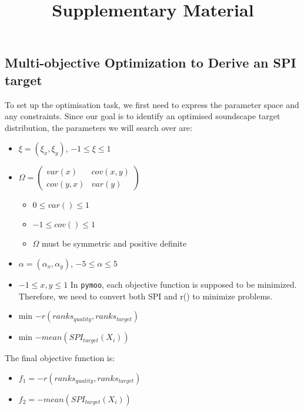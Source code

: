 \documentclass[
  letterpaper,
  DIV=11,
  numbers=noendperiod]{scrartcl}
\title{Supplementary Material}
\author{}
\date{}
\providecommand{\tightlist}{%
  \setlength{\itemsep}{0pt}\setlength{\parskip}{0pt}}\usepackage{longtable,booktabs,array}
\begin{document}
\maketitle


\subsection{Multi-objective Optimization to Derive an SPI
target}\label{multi-objective-optimization-to-derive-an-spi-target}

To set up the optimisation task, we first need to express the parameter
space and any constraints. Since our goal is to identify an optimised
soundscape target distribution, the parameters we will search over are:

\begin{itemize}
\item
  \(\xi = (\xi_x, \xi_y)\), \(-1 \leq \xi \leq 1\)
\item
  \(\Omega = \begin{pmatrix} var(x) & cov(x, y) \\ cov(y, x) & var(y) \end{pmatrix}\)

  \begin{itemize}
  \tightlist
  \item
    \(0 \leq var() \leq 1\)
  \item
    \(-1 \leq cov() \leq 1\)
  \item
    \(\Omega\) must be symmetric and positive definite
  \end{itemize}
\item
  \(\alpha = (\alpha_x, \alpha_y)\), \(-5 \leq \alpha \leq 5\)
\item
  \(-1 \leq x, y \leq 1\) In \texttt{pymoo}, each objective function is
  supposed to be minimized. Therefore, we need to convert both SPI and
  r() to minimize problems.
\item
  min \(-r(ranks_{quality}, ranks_{target})\)
\item
  min \(-mean(SPI_{target}(X_i))\)
\end{itemize}

The final objective function is:

\begin{itemize}
\tightlist
\item
  \(f_1 = -r(ranks_{quality}, ranks_{target})\)
\item
  \(f_2 = -mean(SPI_{target}(X_i))\)
\end{itemize}
\end{document}
